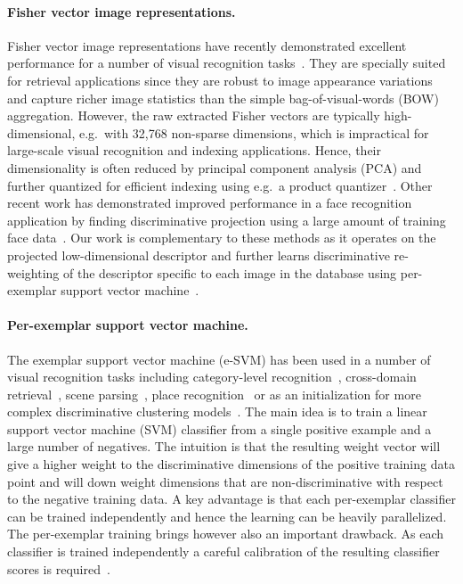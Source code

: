 \documentclass[10pt,twocolumn,letterpaper]{article}
\begin{document}
   \paragraph{Fisher vector image representations.} %
      Fisher vector image representations have recently demonstrated excellent performance for a number of visual recognition tasks~\cite{Chatfield11,Jegou12,Krapac2011,Simonyan2013}. They are specially suited for retrieval applications since they are robust to image appearance variations and capture richer image statistics than the simple bag-of-visual-words (BOW) aggregation. However, the raw extracted Fisher vectors are typically high-dimensional, e.g.\ with 32,768 non-sparse dimensions, which is impractical for large-scale visual recognition and indexing applications. Hence, their dimensionality is often reduced by principal component analysis (PCA) and further quantized for efficient indexing using e.g.\ a product quantizer~\cite{Jegou12}.  Other recent work has demonstrated improved performance in a face recognition application by finding discriminative projection using a large amount of training face data~\cite{Simonyan2013}. Our work is complementary to these methods as it operates on the projected low-dimensional descriptor and further learns discriminative re-weighting of the descriptor specific to each image in the database using per-exemplar support vector machine~\cite{Malisiewicz11}.

   \paragraph{Per-exemplar support vector machine.} %
      The exemplar support vector machine (e-SVM) has been used in a number of visual recognition tasks including category-level recognition~\cite{Malisiewicz11}, cross-domain retrieval~\cite{Shrivastava11}, scene parsing~\cite{Tighe13}, place recognition~\cite{Gronat13} or as an initialization  for more complex discriminative clustering models~\cite{Doersch12,Singh12}. The main idea is to train a linear support vector machine (SVM) classifier from a single positive example and a large number of negatives. The intuition is that the resulting weight vector will give a higher weight to the discriminative dimensions of the positive training data point and will down weight dimensions that are non-discriminative with respect to the negative training data. A key advantage is that each per-exemplar classifier can be trained independently and hence the learning can be heavily parallelized. The per-exemplar training brings however also an important drawback. As each classifier is trained independently a careful calibration of the resulting classifier scores is required~\cite{Gronat13,Malisiewicz11}. 
\end{document}
